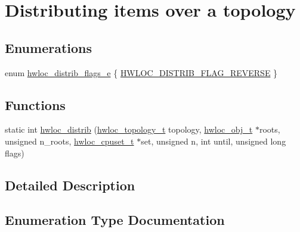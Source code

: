 \hypertarget{a00201}{}\section{Distributing items over a topology}
\label{a00201}
\subsection*{Enumerations}
\begin{DoxyCompactItemize}
\item 
enum \hyperlink{a00201_ga8b835295a52b6768a5e6c8abb1f9c54d}{hwloc\+\_\+distrib\+\_\+flags\+\_\+e} \{ \hyperlink{a00201_gga8b835295a52b6768a5e6c8abb1f9c54da2ca08404bfbebe9ed5f34c3d7635425a}{H\+W\+L\+O\+C\+\_\+\+D\+I\+S\+T\+R\+I\+B\+\_\+\+F\+L\+A\+G\+\_\+\+R\+E\+V\+E\+R\+SE}
 \}
\end{DoxyCompactItemize}
\subsection*{Functions}
\begin{DoxyCompactItemize}
\item 
static int \hyperlink{a00201_ga7b0c28f797c2ff17fa2f244ebbd55b33}{hwloc\+\_\+distrib} (\hyperlink{a00186_ga9d1e76ee15a7dee158b786c30b6a6e38}{hwloc\+\_\+topology\+\_\+t} topology, \hyperlink{a00185_ga79b8ab56877ef99ac59b833203391c7d}{hwloc\+\_\+obj\+\_\+t} $\ast$roots, unsigned n\+\_\+roots, \hyperlink{a00183_ga4bbf39b68b6f568fb92739e7c0ea7801}{hwloc\+\_\+cpuset\+\_\+t} $\ast$set, unsigned n, int until, unsigned long flags)
\end{DoxyCompactItemize}


\subsection{Detailed Description}


\subsection{Enumeration Type Documentation}
\mbox{\label{a00201_ga8b835295a52b6768a5e6c8abb1f9c54d}} 
